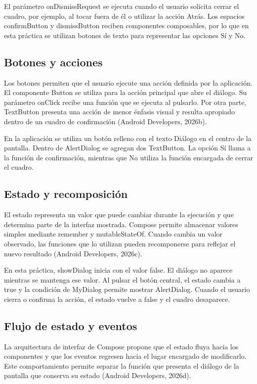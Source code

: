 \documentclass[12pt,a4paper]{article}
\begin{document}
El parámetro onDismissRequest se ejecuta cuando el usuario solicita cerrar el cuadro, por ejemplo, al tocar fuera de él o utilizar la acción Atrás. Los espacios confirmButton y dismissButton reciben componentes composables, por lo que en esta práctica se utilizan botones de texto para representar las opciones Sí y No.

\subsection{Botones y acciones}

Los botones permiten que el usuario ejecute una acción definida por la aplicación. El componente Button se utiliza para la acción principal que abre el diálogo. Su parámetro onClick recibe una función que se ejecuta al pulsarlo. Por otra parte, TextButton presenta una acción de menor énfasis visual y resulta apropiado dentro de un cuadro de confirmación (Android Developers, 2026b).

En la aplicación se utiliza un botón relleno con el texto Diálogo en el centro de la pantalla. Dentro de AlertDialog se agregan dos TextButton. La opción Sí llama a la función de confirmación, mientras que No utiliza la función encargada de cerrar el cuadro.

\subsection{Estado y recomposición}

El estado representa un valor que puede cambiar durante la ejecución y que determina parte de la interfaz mostrada. Compose permite almacenar valores simples mediante remember y mutableStateOf. Cuando cambia un valor observado, las funciones que lo utilizan pueden recomponerse para reflejar el nuevo resultado (Android Developers, 2026c).

En esta práctica, showDialog inicia con el valor false. El diálogo no aparece mientras se mantenga ese valor. Al pulsar el botón central, el estado cambia a true y la condición de MyDialog permite mostrar AlertDialog. Cuando el usuario cierra o confirma la acción, el estado vuelve a false y el cuadro desaparece.

\subsection{Flujo de estado y eventos}

La arquitectura de interfaz de Compose propone que el estado fluya hacia los componentes y que los eventos regresen hacia el lugar encargado de modificarlo. Este comportamiento permite separar la función que presenta el diálogo de la pantalla que conserva su estado (Android Developers, 2026d).
\end{document}
